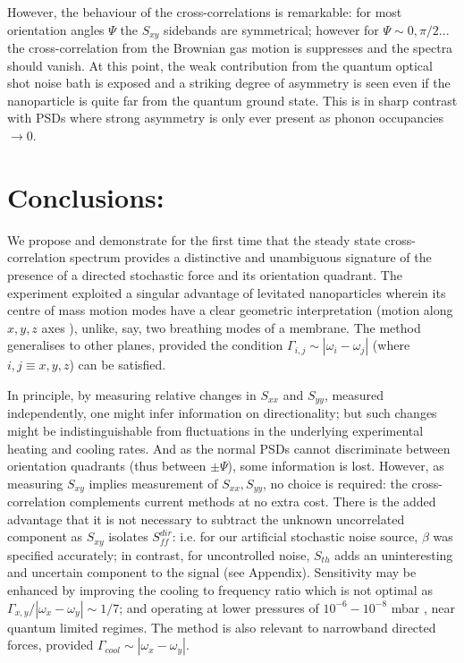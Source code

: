 \documentclass[twocolumn,english,notitlepage,superscriptaddress,nofootinbib]{revtex4-2}
\begin{document}
However, the behaviour of the cross-correlations is remarkable:  for most orientation angles $\Psi$ the $S_{xy}$ sidebands are symmetrical; however for $\Psi \sim 0,\pi/2...$ the cross-correlation from the Brownian gas motion is suppresses and the spectra should vanish.
At this point, the weak contribution from the quantum optical shot noise bath is exposed and a striking degree of asymmetry is seen
even if the nanoparticle is quite far from the quantum ground state.
This is in sharp contrast with PSDs where strong asymmetry is only ever present as phonon occupancies $\to 0$.






\section{ Conclusions:}

 We  propose and demonstrate for the first time  that the steady state cross-correlation spectrum  provides a distinctive and unambiguous signature of the presence 
of a directed stochastic force and   its orientation quadrant.  The experiment  exploited a singular advantage of levitated nanoparticles wherein  its centre of mass motion modes have a clear geometric interpretation (motion  along $x,y,z$ axes \cite{MTTM2020,MTTM2021}),  unlike,  say,  two breathing modes of a  membrane.
The method generalises to other planes,  provided the condition  $\Gamma_{i,j} \sim |\omega_i-\omega_j|$ (where $i, j \equiv x,y,z$) can be satisfied.


 In principle,  by measuring relative changes in $S_{xx}$ and $S_{yy}$,  measured independently,  one might infer  information on directionality;
but such changes might be indistinguishable from fluctuations in the underlying experimental heating and cooling rates.  And as the normal PSDs cannot discriminate between orientation quadrants (thus between $\pm \Psi$),  some information is lost.   However,  as measuring $S_{xy}$ implies measurement of 
 $S_{xx}, S_{yy}$,  no choice is required: the cross-correlation complements current methods at no extra cost.  There is  the added advantage that it is not necessary to subtract the unknown uncorrelated component  as $S_{xy}$  isolates $S_{ff}^{dir}$: i.e. for our artificial stochastic noise source, $\beta$ was specified accurately; in contrast,  for uncontrolled noise,  $S_{th}$  adds an uninteresting and uncertain component to the signal (see Appendix).
Sensitivity  may be enhanced by improving the cooling to frequency ratio which is not optimal as $\Gamma_{x,y} / |\omega_x-\omega_y|\sim 1/7 $; and operating at lower pressures of $10^{-6}-10^{-8}$ mbar , near quantum limited regimes.   The method is also  relevant to narrowband directed forces,  provided  $\Gamma_{cool} \sim |\omega_x-\omega_y|$. 
\end{document}
